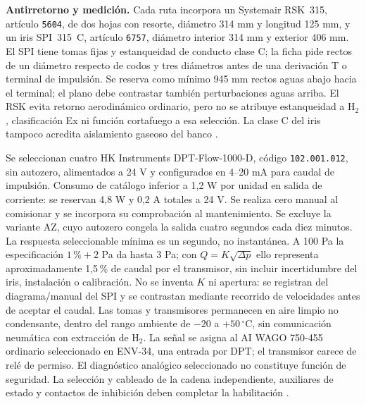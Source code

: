 \textbf{Antirretorno y medición.} Cada ruta incorpora un Systemair RSK~315, artículo \texttt{5604}, de dos hojas con resorte, diámetro 314 mm y longitud 125 mm, y un iris SPI~315~C, artículo \texttt{6757}, diámetro interior 314 mm y exterior 406 mm. El SPI tiene tomas fijas y estanqueidad de conducto clase C; la ficha pide rectos de un diámetro respecto de codos y tres diámetros antes de una derivación T o terminal de impulsión. Se reserva como mínimo 945 mm rectos aguas abajo hacia el terminal; el plano debe contrastar también perturbaciones aguas arriba. El RSK evita retorno aerodinámico ordinario, pero no se atribuye estanqueidad a H$_2$, clasificación Ex ni función cortafuego a esa selección. La clase C del iris tampoco acredita aislamiento gaseoso del banco \parencite[pp.~1--2]{lote28-rsk}\parencite[pp.~1--3]{lote28-spi}.

Se seleccionan cuatro HK Instruments DPT-Flow-1000-D, código \texttt{102.001.012}, sin autozero, alimentados a 24 V y configurados en 4--20 mA para caudal de impulsión. Consumo de catálogo inferior a 1,2 W por unidad en salida de corriente: se reservan 4,8 W y 0,2 A totales a 24 V. Se realiza cero manual al comisionar y se incorpora su comprobación al mantenimiento. Se excluye la variante AZ, cuyo autozero congela la salida cuatro segundos cada diez minutos. La respuesta seleccionable mínima es un segundo, no instantánea. A 100 Pa la especificación $1\,\%+2$ Pa da hasta 3 Pa; con $Q=K\sqrt{\Delta p}$ ello representa aproximadamente 1,5\,\% de caudal por el transmisor, sin incluir incertidumbre del iris, instalación o calibración. No se inventa $K$ ni apertura: se registran del diagrama/manual del SPI y se contrastan mediante recorrido de velocidades antes de aceptar el caudal. Las tomas y transmisores permanecen en aire limpio no condensante, dentro del rango ambiente de $-20$ a $+50\,^{\circ}$C, sin comunicación neumática con extracción de H$_2$. La señal se asigna al AI WAGO 750-455 ordinario seleccionado en ENV-34, una entrada por DPT; el transmisor carece de relé de permiso. El diagnóstico analógico seleccionado no constituye función de seguridad. La selección y cableado de la cadena independiente, auxiliares de estado y contactos de inhibición deben completar la habilitación \parencite[p.~2]{lote28-dpt-ficha}\parencite{lote28-dpt-manual}.


